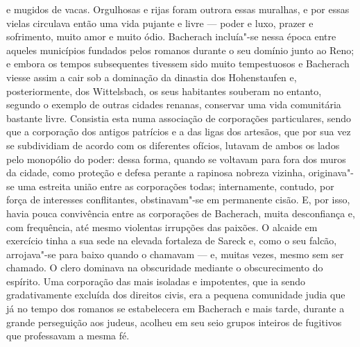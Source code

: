 e mugidos de vacas. Orgulhosas e rijas foram outrora essas muralhas, e
por essas vielas circulava então uma vida pujante e livre --- poder e
luxo, prazer e sofrimento, muito amor e muito ódio. Bacherach
incluía"-se nessa época entre aqueles municípios fundados pelos
romanos durante o seu domínio junto ao Reno; e embora os tempos
subsequentes tivessem sido muito tempestuosos e Bacherach viesse assim
a cair sob a dominação da dinastia dos Hohenstaufen e, posteriormente,
dos Wittelsbach, os seus habitantes souberam no entanto, segundo o
exemplo de outras cidades renanas, conservar uma vida comunitária
bastante livre. Consistia esta numa associação de corporações
particulares, sendo que a corporação dos antigos patrícios e a das
ligas dos artesãos, que por sua vez se subdividiam de acordo com os
diferentes ofícios, lutavam de ambos os lados pelo monopólio do poder:
dessa forma, quando se voltavam para fora dos muros da cidade, como
proteção e defesa perante a rapinosa nobreza vizinha, originava"-se
uma estreita união entre as corporações todas; internamente, contudo,
por força de interesses conflitantes, obstinavam"-se em permanente
cisão. E, por isso, havia pouca convivência entre as corporações de
Bacherach, muita desconfiança e, com frequência, até mesmo violentas
irrupções das paixões. O alcaide em exercício tinha a sua sede na
elevada fortaleza de Sareck e, como o seu falcão, arrojava"-se para
baixo quando o chamavam --- e, muitas vezes, mesmo sem ser chamado. O
clero dominava na obscuridade mediante o obscurecimento do espírito.
Uma corporação das mais isoladas e impotentes, que ia sendo
gradativamente excluída dos direitos civis, era a pequena comunidade
judia que já no tempo dos romanos se estabelecera em Bacherach e mais
tarde, durante a grande perseguição aos judeus, acolheu em seu seio
grupos inteiros de fugitivos que professavam a mesma fé.

